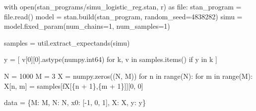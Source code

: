\documentclass[
  letterpaper,
  DIV=11,
  numbers=noendperiod]{scrartcl}
\newenvironment{Shaded}{\begin{snugshade}}{\end{snugshade}}
\newcommand{\BuiltInTok}[1]{\textcolor[rgb]{0.00,0.23,0.31}{#1}}
\newcommand{\ControlFlowTok}[1]{\textcolor[rgb]{0.00,0.23,0.31}{#1}}
\newcommand{\DecValTok}[1]{\textcolor[rgb]{0.68,0.00,0.00}{#1}}
\newcommand{\ImportTok}[1]{\textcolor[rgb]{0.00,0.46,0.62}{#1}}
\newcommand{\KeywordTok}[1]{\textcolor[rgb]{0.00,0.23,0.31}{#1}}
\newcommand{\NormalTok}[1]{\textcolor[rgb]{0.00,0.23,0.31}{#1}}
\newcommand{\OperatorTok}[1]{\textcolor[rgb]{0.37,0.37,0.37}{#1}}
\newcommand{\SpecialCharTok}[1]{\textcolor[rgb]{0.37,0.37,0.37}{#1}}
\newcommand{\SpecialStringTok}[1]{\textcolor[rgb]{0.13,0.47,0.30}{#1}}
\newcommand{\StringTok}[1]{\textcolor[rgb]{0.13,0.47,0.30}{#1}}
\begin{document}
\begin{Shaded}
\begin{Highlighting}[]
\ControlFlowTok{with} \BuiltInTok{open}\NormalTok{(}\StringTok{\textquotesingle{}stan\_programs/simu\_logistic\_reg.stan\textquotesingle{}}\NormalTok{, }\StringTok{\textquotesingle{}r\textquotesingle{}}\NormalTok{) }\ImportTok{as} \BuiltInTok{file}\NormalTok{:}
\NormalTok{  stan\_program }\OperatorTok{=} \BuiltInTok{file}\NormalTok{.read()}
\NormalTok{model }\OperatorTok{=}\NormalTok{ stan.build(stan\_program, random\_seed}\OperatorTok{=}\DecValTok{4838282}\NormalTok{)}
\NormalTok{simu }\OperatorTok{=}\NormalTok{ model.fixed\_param(num\_chains}\OperatorTok{=}\DecValTok{1}\NormalTok{, num\_samples}\OperatorTok{=}\DecValTok{1}\NormalTok{)}

\NormalTok{samples }\OperatorTok{=}\NormalTok{ util.extract\_expectands(simu)}

\NormalTok{y }\OperatorTok{=}\NormalTok{ [ v[}\DecValTok{0}\NormalTok{][}\DecValTok{0}\NormalTok{].astype(numpy.int64) }\ControlFlowTok{for}\NormalTok{ k, v }\KeywordTok{in}\NormalTok{ samples.items() }\ControlFlowTok{if} \StringTok{\textquotesingle{}y\textquotesingle{}} \KeywordTok{in}\NormalTok{ k ]}

\NormalTok{N }\OperatorTok{=} \DecValTok{1000}
\NormalTok{M }\OperatorTok{=} \DecValTok{3}
\NormalTok{X }\OperatorTok{=}\NormalTok{ numpy.zeros((N, M))}
\ControlFlowTok{for}\NormalTok{ n }\KeywordTok{in} \BuiltInTok{range}\NormalTok{(N):}
  \ControlFlowTok{for}\NormalTok{ m }\KeywordTok{in} \BuiltInTok{range}\NormalTok{(M):}
\NormalTok{    X[n, m] }\OperatorTok{=}\NormalTok{ samples[}\SpecialStringTok{f\textquotesingle{}X[}\SpecialCharTok{\{}\NormalTok{n }\OperatorTok{+} \DecValTok{1}\SpecialCharTok{\}}\SpecialStringTok{,}\SpecialCharTok{\{}\NormalTok{m }\OperatorTok{+} \DecValTok{1}\SpecialCharTok{\}}\SpecialStringTok{]\textquotesingle{}}\NormalTok{][}\DecValTok{0}\NormalTok{, }\DecValTok{0}\NormalTok{]}

\NormalTok{data }\OperatorTok{=}\NormalTok{ \{}\StringTok{\textquotesingle{}M\textquotesingle{}}\NormalTok{: M, }\StringTok{\textquotesingle{}N\textquotesingle{}}\NormalTok{: N, }\StringTok{\textquotesingle{}x0\textquotesingle{}}\NormalTok{: [}\OperatorTok{{-}}\DecValTok{1}\NormalTok{, }\DecValTok{0}\NormalTok{, }\DecValTok{1}\NormalTok{], }\StringTok{\textquotesingle{}X\textquotesingle{}}\NormalTok{: X, }\StringTok{\textquotesingle{}y\textquotesingle{}}\NormalTok{: y\}}
\end{Highlighting}
\end{Shaded}
\end{document}
